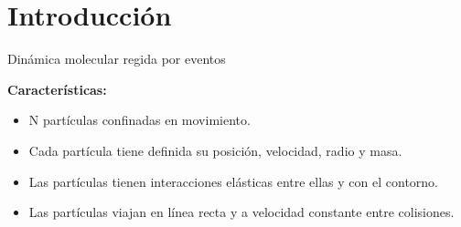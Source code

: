 \section{Introducción}\label{sec:introduccion}

\begin{frame}{Dinámica molecular regida por eventos}

    \begin{block}
        \textbf{Características:}
        \begin{itemize}
            \item N partículas confinadas en movimiento.
            \item Cada partícula tiene definida su posición, velocidad, radio y masa.
            \item Las partículas tienen interacciones elásticas entre ellas y con el contorno.
            \item Las partículas viajan en línea recta y a velocidad constante entre colisiones.
        \end{itemize}
    \end{block}

\end{frame}

